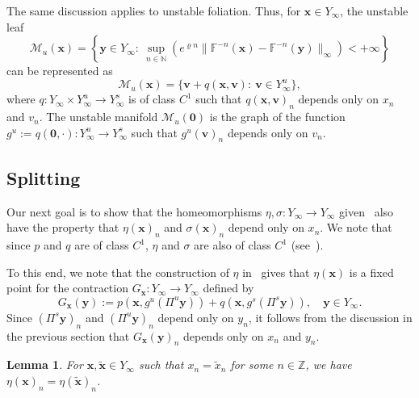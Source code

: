 \documentclass[reqno, a4paper, 10pt]{amsart}
\theoremstyle{plain}
\numberwithin{equation}{section}
\newtheorem{lemma}{Lemma}
\theoremstyle{remark}
\def\Id{\text{\rm Id}}
\begin{document}
The same discussion applies to unstable foliation. Thus, for $\mathbf x\in Y_\infty$, the unstable leaf \[\mathcal M_u(\mathbf x)=\left \{\mathbf y\in Y_\infty: \  \sup_{n\in \mathbb N}(e^{\varrho n}\|\mathbb F^{-n}(\mathbf x)-\mathbb F^{-n} (\mathbf y)\|_\infty) <+\infty \right \}\] can be represented as 
\[
\mathcal M_u(\mathbf x)=\{\mathbf v+q(\mathbf x, \mathbf v): \ \mathbf v\in Y_\infty^u\},
\]
where $q\colon Y_\infty \times Y_\infty^u \to Y_\infty^s$ is of class $C^1$ such that $q(\mathbf x, \mathbf v)_n$ depends only on $x_n$ and $v_n$. The unstable manifold $\mathcal M_u(\mathbf 0)$ is the graph of the function $g^u:=q(\mathbf 0, \cdot) \colon Y_\infty^u \to Y_\infty^s$ such that $g^u(\mathbf v)_n$ depends only on $v_n$. %

\subsection{Splitting}\label{splitting}
Our next goal is to show that the homeomorphisms $\eta, \sigma \colon Y_\infty \to Y_\infty$ given~\cite[Lemma 3.1]{BT} also have the property that $\eta(\mathbf x)_n$ and $\sigma(\mathbf x)_n$ depend only on $x_n$.  We note that since $p$ and $q$ are of class $C^1$, $\eta$ and $\sigma$ are also of class $C^1$ (see~\cite[Lemma 3.1]{BT}).

To this end,  we note that the construction of $\eta$ in~\cite[Lemma 3.1]{BT} gives that 
$\eta(\mathbf x)$ is a fixed point for the contraction $G_\mathbf x\colon Y_\infty \to Y_\infty$ defined by 
\[
G_\mathbf x(\mathbf y):=p(\mathbf x, g^u(\Pi^u \mathbf y))+q(\mathbf x, g^s(\Pi^s\mathbf y)), \quad \mathbf y\in Y_\infty.
\]
Since $(\Pi^s \mathbf y)_n$ and $(\Pi^u \mathbf y)_n$ depend only on $y_n$, it follows from the discussion in the previous section that $G_\mathbf x(\mathbf y)_n$ depends only on $x_n$ and $y_n$.

\begin{lemma}\label{lem eta n depend on xn}
For $\mathbf x, \tilde{\mathbf x}\in Y_\infty$ such that $x_n=\tilde x_n$ for some $n\in \mathbb Z$, we have $\eta(\mathbf x)_n=\eta(\tilde{\mathbf x})_n$.
\end{lemma}
\end{document}
